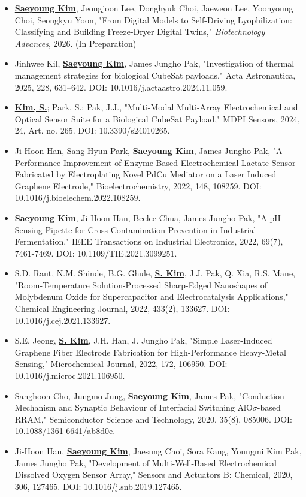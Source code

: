 \documentclass[letterpaper,11pt]{moderncv}
\begin{document}
\begin{sloppypar} %
\begin{itemize}[leftmargin=1cm, itemsep=0pt, parsep=0pt]
    \item \textbf{\underline{Saeyoung Kim}}, Jeongjoon Lee, Donghyuk Choi, Jaeweon Lee, Yoonyoung Choi, Seongkyu Yoon, "From Digital Models to Self-Driving Lyophilization: Classifying and Building Freeze-Dryer Digital Twins," \textit{Biotechnology Advances}, 2026. (In Preparation)
    \item Jinhwee Kil, \textbf{\underline{Saeyoung Kim}}, James Jungho Pak, "Investigation of thermal management strategies for biological CubeSat payloads," Acta Astronautica, 2025, 228, 631--642. DOI: 10.1016/j.actaastro.2024.11.059.
    \item \textbf{\underline{Kim, S.}}; Park, S.; Pak, J.J., "Multi-Modal Multi-Array Electrochemical and Optical Sensor Suite for a Biological CubeSat Payload," MDPI Sensors, 2024, 24, Art. no. 265. DOI: 10.3390/s24010265.
    \item Ji-Hoon Han, Sang Hyun Park, \textbf{\underline{Saeyoung Kim}}, James Jungho Pak, "A Performance Improvement of Enzyme-Based Electrochemical Lactate Sensor Fabricated by Electroplating Novel PdCu Mediator on a Laser Induced Graphene Electrode," Bioelectrochemistry, 2022, 148, 108259. DOI: 10.1016/j.bioelechem.2022.108259.
    \item \textbf{\underline{Saeyoung Kim}}, Ji-Hoon Han, Beelee Chua, James Jungho Pak, "A pH Sensing Pipette for Cross-Contamination Prevention in Industrial Fermentation," IEEE Transactions on Industrial Electronics, 2022, 69(7), 7461-7469. DOI: 10.1109/TIE.2021.3099251.
    \item S.D. Raut, N.M. Shinde, B.G. Ghule, \textbf{\underline{S. Kim}}, J.J. Pak, Q. Xia, R.S. Mane, "Room-Temperature Solution-Processed Sharp-Edged Nanoshapes of Molybdenum Oxide for Supercapacitor and Electrocatalysis Applications," Chemical Engineering Journal, 2022, 433(2), 133627. DOI: 10.1016/j.cej.2021.133627.
    \item S.E. Jeong, \textbf{\underline{S. Kim}}, J.H. Han, J. Jungho Pak, "Simple Laser-Induced Graphene Fiber Electrode Fabrication for High-Performance Heavy-Metal Sensing," Microchemical Journal, 2022, 172, 106950. DOI: 10.1016/j.microc.2021.106950.
    \item Sanghoon Cho, Jungmo Jung, \textbf{\underline{Saeyoung Kim}}, James Pak, "Conduction Mechanism and Synaptic Behaviour of Interfacial Switching AlO$\sigma$-based RRAM," Semiconductor Science and Technology, 2020, 35(8), 085006. DOI: 10.1088/1361-6641/ab8d0e.
    \item Ji-Hoon Han, \textbf{\underline{Saeyoung Kim}}, Jaesung Choi, Sora Kang, Youngmi Kim Pak, James Jungho Pak, "Development of Multi-Well-Based Electrochemical Dissolved Oxygen Sensor Array," Sensors and Actuators B: Chemical, 2020, 306, 127465. DOI: 10.1016/j.snb.2019.127465.
\end{itemize}
\end{sloppypar}
\end{document}
